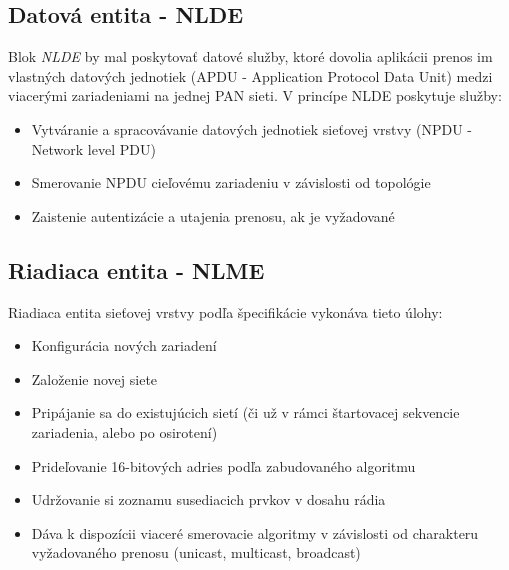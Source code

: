 \subsection{Datová entita - NLDE}
\indent\indent Blok \textit{NLDE} by mal poskytovať datové služby, ktoré dovolia aplikácii prenos im vlastných datových jednotiek (APDU - Application Protocol Data Unit) medzi viacerými zariadeniami na jednej PAN sieti. V princípe NLDE poskytuje služby:
\begin{itemize}
\item Vytváranie a spracovávanie datových jednotiek sieťovej vrstvy (NPDU - Network level PDU)
\item Smerovanie NPDU cieľovému zariadeniu v závislosti od topológie
\item Zaistenie autentizácie a utajenia prenosu, ak je vyžadované
\end{itemize}

\subsection{Riadiaca entita - NLME}
\indent\indent Riadiaca entita sieťovej vrstvy podľa špecifikácie vykonáva tieto úlohy:
\begin{itemize}
\item Konfigurácia nových zariadení
\item Založenie novej siete
\item Pripájanie sa do existujúcich sietí (či už v rámci štartovacej sekvencie zariadenia, alebo po osirotení)
\item Prideľovanie 16-bitových adries podľa zabudovaného algoritmu
\item Udržovanie si zoznamu susediacich prvkov v dosahu rádia
\item Dáva k dispozícii viaceré smerovacie algoritmy v závislosti od charakteru vyžadovaného prenosu (unicast, multicast, broadcast)
\end{itemize}

